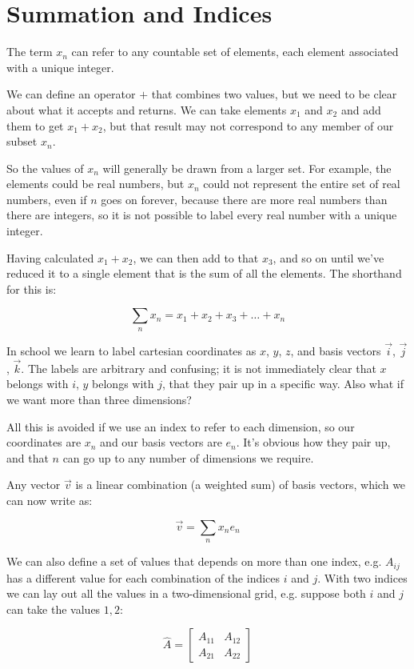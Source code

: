 \chapter{Summation and Indices}

The term $x_n$ can refer to any countable set of elements, each element associated with a unique integer.

We can define an operator $+$ that combines two values, but we need to be clear about what it accepts and returns. We can take elements $x_1$ and $x_2$ and add them to get $x_1 + x_2$, but that result may not correspond to any member of our subset $x_n$.

So the values of $x_n$ will generally be drawn from a larger set. For example, the elements could be real numbers, but $x_n$ could not represent the entire set of real numbers, even if $n$ goes on forever, because there are more real numbers than there are integers, so it is not possible to label every real number with a unique integer.

Having calculated $x_1 + x_2$, we can then add to that $x_3$, and so on until we've reduced it to a single element that is the sum of all the elements. The shorthand for this is:

$$\sum_n{x_n} = x_1 + x_2 + x_3 + \dots + x_n$$

In school we learn to label cartesian coordinates as $x$, $y$, $z$, and basis vectors $\vec{i}$, $\vec{j}$, $\vec{k}$. The labels are arbitrary and confusing; it is not immediately clear that $x$ belongs with $i$, $y$ belongs with $j$, that they pair up in a specific way. Also what if we want more than three dimensions?

All this is avoided if we use an index to refer to each dimension, so our coordinates are $x_n$ and our basis vectors are $e_n$. It's obvious how they pair up, and that $n$ can go up to any number of dimensions we require.

Any vector $\vec{v}$ is a linear combination (a weighted sum) of basis vectors, which we can now write as:

$$\vec{v} = \sum_n{x_n e_n}$$

We can also define a set of values that depends on more than one index, e.g. $A_{ij}$ has a different value for each combination of the indices $i$ and $j$. With two indices we can lay out all the values in a two-dimensional grid, e.g. suppose both $i$ and $j$ can take the values ${1, 2}$:

$$\hat{A} = \begin{bmatrix}A_{11} & A_{12} \\ A_{21} & A_{22}\end{bmatrix}$$

